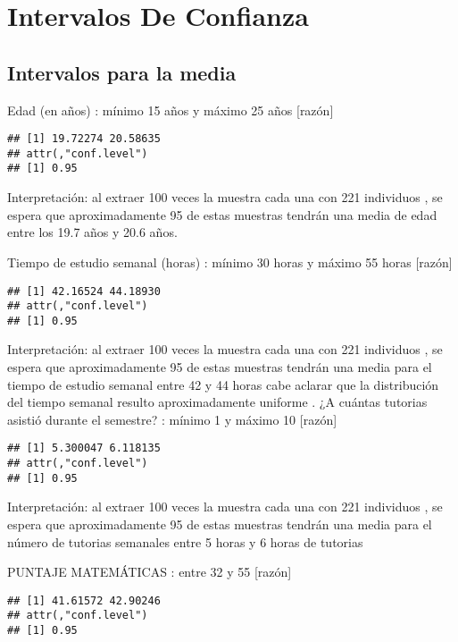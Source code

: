 \documentclass[
  man]{apa6}
\begin{document}
\clearpage

\hypertarget{intervalos-de-confianza}{%
\section{Intervalos De Confianza}\label{intervalos-de-confianza}}

\hypertarget{intervalos-para-la-media}{%
\subsection{Intervalos para la media}\label{intervalos-para-la-media}}

Edad (en años) : mínimo 15 años y máximo 25 años {[}razón{]}

\begin{verbatim}
## [1] 19.72274 20.58635
## attr(,"conf.level")
## [1] 0.95
\end{verbatim}

Interpretación: al extraer 100 veces la muestra cada una con 221
individuos , se espera que aproximadamente 95 de estas muestras tendrán
una media de edad entre los 19.7 años y 20.6 años.

Tiempo de estudio semanal (horas) : mínimo 30 horas y máximo 55 horas
{[}razón{]}

\begin{verbatim}
## [1] 42.16524 44.18930
## attr(,"conf.level")
## [1] 0.95
\end{verbatim}

Interpretación: al extraer 100 veces la muestra cada una con 221
individuos , se espera que aproximadamente 95 de estas muestras tendrán
una media para el tiempo de estudio semanal entre 42 y 44 horas cabe
aclarar que la distribución del tiempo semanal resulto aproximadamente
uniforme .
\newpage
¿A cuántas tutorias asistió durante el semestre? : mínimo 1 y máximo 10
{[}razón{]}

\begin{verbatim}
## [1] 5.300047 6.118135
## attr(,"conf.level")
## [1] 0.95
\end{verbatim}

Interpretación: al extraer 100 veces la muestra cada una con 221
individuos , se espera que aproximadamente 95 de estas muestras tendrán
una media para el número de tutorias semanales entre 5 horas y 6 horas
de tutorias

PUNTAJE MATEMÁTICAS : entre 32 y 55 {[}razón{]}

\begin{verbatim}
## [1] 41.61572 42.90246
## attr(,"conf.level")
## [1] 0.95
\end{verbatim}
\end{document}
